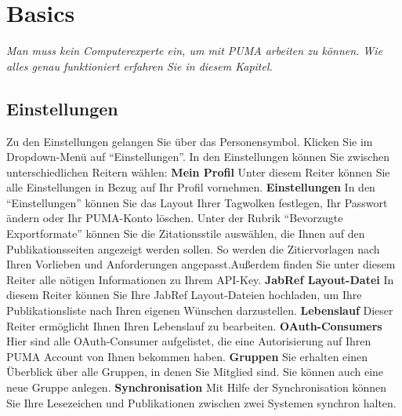 \chapter{Basics}
\textit{Man muss kein Computerexperte ein, um mit PUMA arbeiten zu können. Wie alles genau funktioniert erfahren Sie in diesem Kapitel.}
\section{Einstellungen}
Zu den Einstellungen gelangen Sie über das Personensymbol. Klicken Sie im Dropdown-Menü auf \enquote{Einstellungen}. In den Einstellungen können Sie zwischen unterschiedlichen Reitern wählen:\newline \newline
\textbf{Mein Profil} \newline
Unter diesem Reiter können Sie alle Einstellungen in Bezug auf Ihr Profil vornehmen.\newline \newline 
\textbf{Einstellungen} \newline
In den \enquote{Einstellungen} können Sie das Layout Ihrer Tagwolken festlegen, Ihr Passwort ändern oder Ihr PUMA-Konto löschen. Unter der Rubrik \enquote{Bevorzugte Exportformate} können Sie die Zitationsstile auswählen, die Ihnen auf den Publikationsseiten angezeigt werden sollen. So werden die Zitiervorlagen nach Ihren Vorlieben und Anforderungen angepasst.\newline Außerdem finden Sie unter diesem Reiter alle nötigen Informationen zu Ihrem API-Key.\newline \newline
\textbf{JabRef Layout-Datei}\newline
In diesem Reiter können Sie Ihre JabRef Layout-Dateien hochladen, um Ihre Publikationsliste nach Ihren eigenen Wünschen darzustellen.  \newline \newline
\textbf{Lebenslauf} \newline
Dieser Reiter ermöglicht Ihnen Ihren Lebenslauf zu bearbeiten. \newline \newline
\textbf{OAuth-Consumers} \newline
Hier sind alle OAuth-Consumer aufgelistet, die eine Autorisierung auf Ihren PUMA Account von Ihnen bekommen haben. \newline \newline
\textbf{Gruppen}\newline
Sie erhalten einen Überblick über alle Gruppen, in denen Sie Mitglied sind. Sie können auch eine neue Gruppe anlegen. \newline \newline
\textbf{Synchronisation} \newline
Mit Hilfe der Synchronisation können Sie Ihre Lesezeichen und Publikationen zwischen zwei Systemen synchron halten.  
